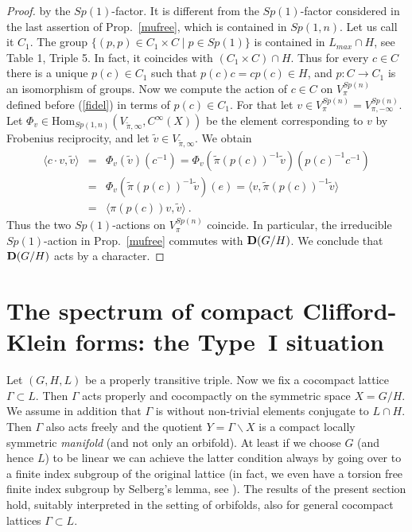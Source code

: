\documentclass[10]{amsart}
\theoremstyle{remark}
\newtheorem{rem}[thm]{Remark}
\theoremstyle{definition}
\numberwithin{equation}{section}
\newcommand{\Hom}{\mathrm{Hom}}
\begin{document}
{\begin{proof}
by the $Sp(1)$-factor. It is different from the $Sp(1)$-factor considered in the last assertion of Prop.~\ref{mufree}, which is contained in $Sp(1,n)$. Let us call it $C_1$. The group 
$\{(p,p)\in C_1\times C\mid p\in Sp(1)\}$ is contained in $L_{max}\cap H$, see Table 1, Triple 5. In fact, it coincides with $(C_1\times C)\cap H$.
Thus for every $c\in C$ there is a unique $p(c)\in C_1$ such that $p(c)c=cp(c)\in H$, and $p: C\rightarrow C_1$ is an isomorphism of groups. Now we compute the action of $c\in C$ on
$V_\pi^{Sp(n)}$
defined before (\ref{fidel}) in terms of $p(c)\in C_1$. For that let $v\in V_\pi^{Sp(n)}=V_{\pi,-\infty}^{Sp(n)}$. Let  $\Phi_v\in \Hom_{Sp(1,n)}(V_{\tilde\pi,\infty}, C^\infty(X))$  be the element
corresponding to $v$ by Frobenius reciprocity, and let $\tilde v \in   V_{\tilde\pi,\infty}$. We obtain
\begin{eqnarray*}
\langle c\cdot v,\tilde v\rangle&=&\Phi_v(\tilde v)(c^{-1})=\Phi_v(\tilde\pi(p(c))^{-1}\tilde v)(p(c)^{-1}c^{-1})\\
&=& \Phi_v(\tilde\pi(p(c))^{-1}\tilde v)(e)=\langle v,\tilde\pi(p(c))^{-1}\tilde v\rangle\\
&=& \langle\pi(p(c))v,\tilde v\rangle\ .
\end{eqnarray*} 
Thus the two $Sp(1)$-actions on $V_\pi^{Sp(n)}$ coincide. In particular, the irreducible $Sp(1)$-action in Prop.~\ref{mufree} commutes with ${\bf D}(G/H)$. We
conclude that ${\bf D}(G/H)$ acts by a character.
\end{proof}

\section{The spectrum of compact Clifford-Klein forms: the Type~I situation}\label{spectrum}

Let $(G,H,L)$ be a properly transitive triple. Now we fix a cocompact lattice $\Gamma\subset L$. Then $\Gamma$ acts properly and cocompactly
on the symmetric space $X=G/H$. 
We assume in addition that $\Gamma$ is without non-trivial elements conjugate to $L\cap H$. Then $\Gamma$ also acts freely and the quotient 
$Y=\Gamma\backslash X$ is a compact locally symmetric {\em manifold} (and not only an orbifold). At least if we choose $G$ (and hence $L$) to be linear we can achieve the latter condition always by going
over to a finite index subgroup of the original lattice (in fact, we even have a torsion free finite index subgroup by Selberg's lemma, see \cite{Rat06}).
The results of the present section hold, suitably interpreted in the setting of orbifolds, also for general cocompact lattices $\Gamma\subset L$.

}
\end{document}
